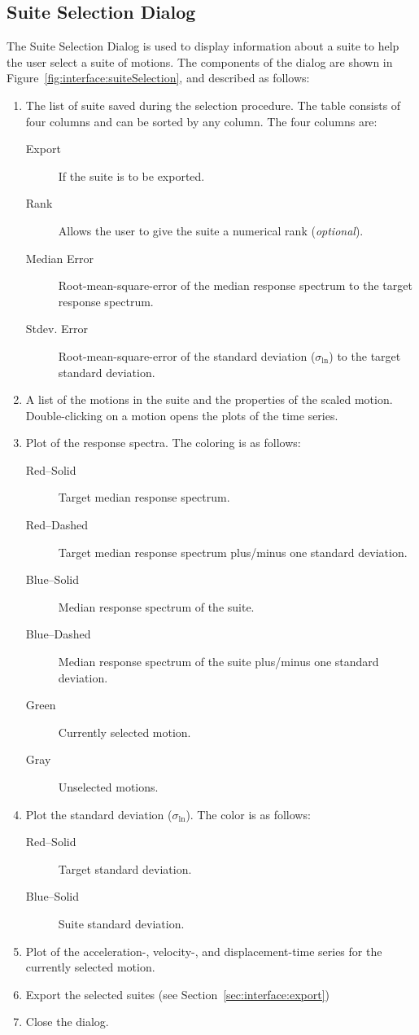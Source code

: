 \documentclass[11pt]{article}
\begin{document}
\subsection{Suite Selection Dialog}
\label{sec:interface:suiteSelection}

The Suite Selection Dialog is used to display information about a suite
to help the user select a suite of motions.  The components of the dialog are
shown in Figure~\ref{fig:interface:suiteSelection}, and described as follows:
\begin{enumerate}
  \item The list of suite saved during the selection procedure. The table
	consists of four columns and can be sorted by any column. The four columns
	are:
	\begin{description}
	  \item[Export] If the suite is to be exported.
	  \item[Rank] Allows the user to give the suite a numerical rank (\emph{optional}).
	  \item[Median Error] Root-mean-square-error of the median response spectrum to
		the target response spectrum.
	  \item[Stdev. Error] Root-mean-square-error of the standard deviation
		($\sigma_{\ln}$) to the target standard deviation.
	\end{description}
  \item A list of the motions in the suite and the properties of the scaled
	motion. Double-clicking on a motion opens the plots of the time series.
  \item Plot of the response spectra. The coloring is as follows:
	\begin{description}
	  \item[Red--Solid] Target median response spectrum.
	  \item[Red--Dashed] Target median response spectrum plus/minus one standard
		deviation.
	  \item[Blue--Solid] Median response spectrum of the suite.
	  \item[Blue--Dashed] Median response spectrum of the suite plus/minus one
		standard deviation.
	  \item[Green] Currently selected motion.
	  \item[Gray] Unselected motions.
	\end{description}
  \item Plot the standard deviation ($\sigma_{\ln}$). The color is as follows:
	\begin{description}
	  \item[Red--Solid] Target standard deviation.
	  \item[Blue--Solid] Suite standard deviation.
	\end{description}
  \item Plot of the acceleration-, velocity-, and displacement-time series for
	the currently selected motion.
  \item Export the selected suites (see Section~\ref{sec:interface:export})
  \item Close the dialog.
\end{enumerate}
\end{document}
